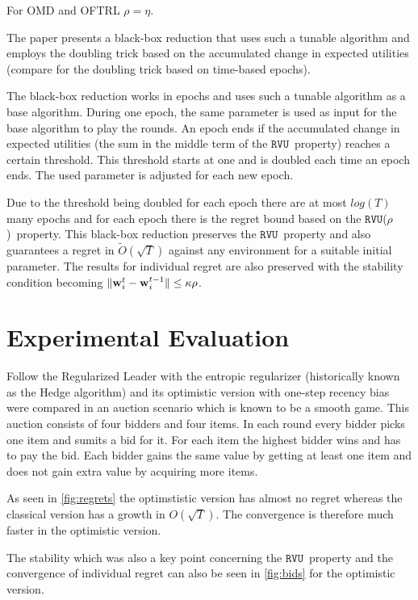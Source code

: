 \documentclass[a4paper]{article}
\theoremstyle{definition}
\newcommand{\myprop}{\ensuremath{\texttt{RVU}}}
\newcommand{\mst}{\ensuremath{w}}
\newcommand{\stable}{\ensuremath{\kappa}}
\newcommand{\knob}{\ensuremath{\rho}}
\renewcommand{\vec}[1]{\ensuremath{{\bf #1}}}
\begin{document}
For OMD and OFTRL $ \knob = \eta$.

The paper presents a black-box reduction that uses such a tunable algorithm and employs
the doubling trick based on the accumulated change in
expected utilities (compare \cite[p.130]{Foundations} for the doubling
trick based on time-based epochs).

The black-box reduction works in epochs and uses such a tunable
algorithm as a base algorithm.
During one epoch, the same parameter is used as input for the base
algorithm to play the rounds.
An epoch ends if the accumulated change in expected utilities (the sum in the
middle term of the \myprop~property) reaches a certain threshold.
This threshold starts at one and is doubled each time an epoch ends.
The used parameter is adjusted for each new epoch.

Due to the threshold being doubled for each epoch there are at most $log(T)$ many epochs and for
each epoch there is the regret bound based on the
\myprop(\knob)~property.
This black-box reduction preserves the \myprop~property and also
guarantees a regret in
$\tilde{O}(\sqrt{T})$ against any environment for a
suitable initial parameter.
The results for individual regret are also preserved with the stability
condition becoming $\|\vec{\mst}_i^t-\vec{\mst}_i^{t-1}\| \leq \stable\knob$.



\section{Experimental Evaluation}

Follow the Regularized Leader with the entropic regularizer
(historically known as the Hedge algorithm) and its optimistic version
with one-step recency bias were compared in an auction scenario which is
known to be a smooth game.
This auction consists of four bidders and four items.
In each round every bidder picks one item and sumits a bid for it.
For each item the highest bidder wins and has to pay the bid.
Each bidder gains the same value by getting at least one item and does
not gain extra value by acquiring more items.

As seen in \autoref{fig:regrets} the optimstistic version has almost no regret
whereas the classical version has a growth in $O(\sqrt{T})$.
The convergence is therefore much faster in the optimistic version.

The stability which was also a key point concerning the
\myprop~property and the convergence of individual regret can also be
seen in \autoref{fig:bids} for the optimistic version.
\end{document}

